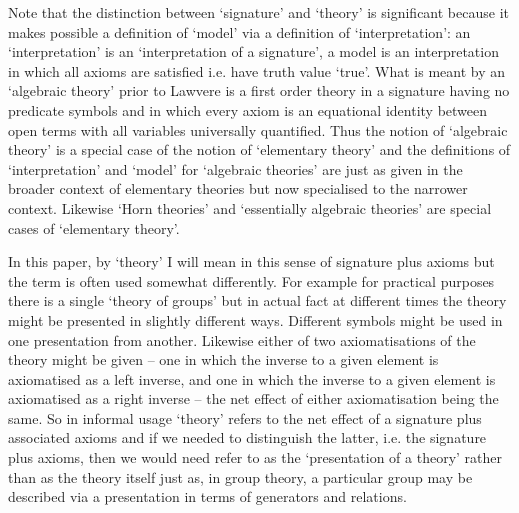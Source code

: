 \note
Note that the distinction between `signature' and `theory' is significant because it makes possible a definition of `model' 
via a definition of `interpretation': an `interpretation' is an `interpretation of a signature', 
a model is an interpretation in which all axioms are satisfied i.e. have truth value `true'.   
\note
What is meant by an `algebraic theory' prior to Lawvere is a first order theory in a signature having no predicate symbols and in which every axiom is an equational identity between open terms with all variables universally quantified. Thus the notion of `algebraic theory' is  
 a special case of the notion of `elementary theory' and the 
definitions of `interpretation' and `model' for `algebraic theories' are just as given in the broader context of elementary theories but now specialised to the narrower context. Likewise  `Horn theories' and `essentially algebraic theories' are special cases of `elementary theory'. 

\note 
In this paper, by `theory' I will mean in this sense of signature plus axioms but 
the term is often used somewhat differently. For example for practical purposes there is a single `theory of groups'  but in actual fact at different times the theory might be presented in slightly different ways. Different symbols might be used in one presentation from another. Likewise either of two axiomatisations of the theory might be given -- one in which the inverse to a given element is axiomatised as a left inverse, and one in which the inverse to a given element is axiomatised as a right inverse -- the net effect of either axiomatisation being the same.
So in informal usage `theory' refers to the net effect of a signature plus associated axioms  and if we needed to distinguish the latter, i.e. the signature plus axioms, then we would need refer to as the `presentation of a theory' rather than as the theory itself just as, in group theory, a particular group may be described via a presentation in terms of generators and relations.  

